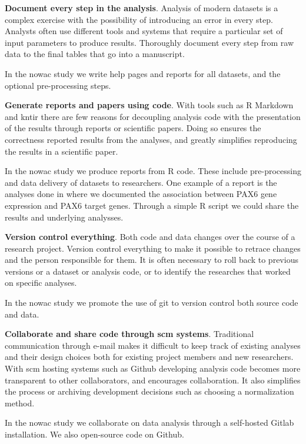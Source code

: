 \textbf{Document every step in the analysis}. Analysis of modern datasets is a
complex exercise with the possibility of introducing an error in every step.
Analysts often use different tools and systems that require a particular set of
input parameters to produce results. Thoroughly document every step from raw
data to the final tables that go into a manuscript.

In the \gls{nowac} study we write help pages and reports for all datasets, and
the optional pre-processing steps. 

\textbf{Generate reports and papers using code}. With tools such as R
Markdown\cite{rmarkdown} and kntir there are few reasons for decoupling analysis
code with the presentation of the results through reports or scientific papers.
Doing so ensures the correctness reported results from the analyses, and greatly
simplifies reproducing the results in a scientific paper. 

In the \gls{nowac} study we produce reports from R code. These include
pre-processing and data delivery of datasets to researchers. One example of a
report is the analyses done in \cite{kiselev2018transcription} where we
documented the association between PAX6 gene expression and PAX6 target genes.
Through a simple R script we could share the results and underlying analysses.

\textbf{Version control everything}. Both code and data changes over the course
of a research project. Version control everything to make it possible to retrace
changes and the person responsible for them. It is often necessary to roll back
to previous versions or a dataset or analysis code, or to identify the
researches that worked on specific analyses. 

In the \gls{nowac} study we promote the use of git to version control both
source code and data. 

\textbf{Collaborate and share code through \gls{scm} systems}. Traditional
communication through e-mail makes it difficult to keep track of existing
analyses and their design choices both for existing project members and new
researchers. With \gls{scm} hosting systems such as Github developing
analysis code becomes more transparent to other collaborators, and encourages
collaboration. It also simplifies the process or archiving development decisions
such as choosing a normalization method.

In the \gls{nowac} study we collaborate on data analysis through a self-hosted
Gitlab\cite{gitlab} installation. We also open-source code on Github. 

